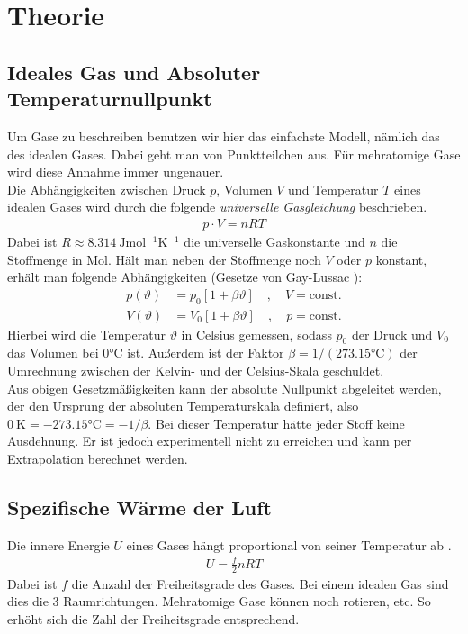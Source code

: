 \documentclass[12pt,a4paper,titlepage,headinclude,bibtotoc]{scrartcl}
\begin{document}
\section{Theorie}
\label{sec:theorie}
\subsection{Ideales Gas und Absoluter Temperaturnullpunkt}
Um Gase zu beschreiben benutzen wir hier das einfachste Modell, nämlich das des idealen Gases.
Dabei geht man von Punktteilchen aus.
Für mehratomige Gase wird diese Annahme immer ungenauer.\\
Die Abhängigkeiten zwischen Druck $p$, Volumen $V$ und Temperatur $T$ eines idealen Gases wird durch die folgende \textit{universelle Gasgleichung} \cite[S.261]{gerthsen} beschrieben.
\begin{align}
 p \cdot V = nRT
 \label{eq:uGasGl}
\end{align}
Dabei ist $R\approx 8.314 ~ \si{\joule \mol^{-1} \kelvin^{-1}}$ die universelle Gaskonstante und $n$ die Stoffmenge in Mol.
Hält man neben der Stoffmenge noch $V$ oder $p$ konstant, erhält man folgende Abhängigkeiten (Gesetze von Gay-Lussac \cite[S.261]{gerthsen}):
\begin{align}
	p(\vartheta)&=p_0 [1+\beta\vartheta] \quad, \quad V =\text{const.}\\
	V(\vartheta)&=V_0 [1+\beta\vartheta] \quad, \quad p=\text{const.}
\end{align}
Hierbei wird die Temperatur $\vartheta$ in Celsius gemessen, sodass $p_0$ der Druck und $V_0$ das Volumen bei $0\si{\celsius}$ ist.
Außerdem ist der Faktor $\beta=1/(273.15 \si{\celsius})$ der Umrechnung zwischen der Kelvin- und der Celsius-Skala geschuldet.\\
Aus obigen Gesetzmäßigkeiten kann der absolute Nullpunkt abgeleitet werden, der den Ursprung der absoluten Temperaturskala definiert, also $0~\si{\kelvin}=-273.15 \si{\celsius}=-1/\beta$.
Bei dieser Temperatur hätte jeder Stoff keine Ausdehnung.
Er ist jedoch experimentell nicht zu erreichen und kann per Extrapolation berechnet werden.

\subsection{Spezifische Wärme der Luft}
Die innere Energie $U$ eines Gases hängt proportional von seiner Temperatur ab \cite[S.257]{gerthsen}.
\begin{align}
	U=\frac{f}{2} n R T
\end{align}
Dabei ist $f$ die Anzahl der Freiheitsgrade des Gases.
Bei einem idealen Gas sind dies die 3 Raumrichtungen.
Mehratomige Gase können noch rotieren, etc.
So erhöht sich die Zahl der Freiheitsgrade entsprechend.\\
\end{document}
